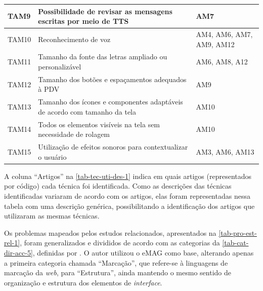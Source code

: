 \begin{table}[htb]
\begin{center}
\begin{tabular}{p{1.2cm}|p{9.2cm}|p{4.1cm}}
            \hline
            TAM9            & Possibilidade de revisar as mensagens escritas por meio de TTS                                     & AM7                                                                  \\
            \hline
            TAM10           & Reconhecimento de voz                                                                              & AM4, AM6, AM7, AM9, AM12                                             \\
            \hline
            TAM11           & Tamanho da fonte das letras ampliado ou personalizável                                             & AM6, AM8, A12                                                        \\
            \hline
            TAM12           & Tamanho dos botões e espaçamentos adequados à PDV                                                  & AM9                                                                  \\
            \hline
            TAM13           & Tamanho dos ícones e componentes adaptáveis de acordo com tamanho da tela                          & AM10                                                                 \\
            \hline
            TAM14           & Todos os elementos visíveis na tela sem necessidade de rolagem                                     & AM10                                                                 \\
            \hline
            TAM15           & Utilização de efeitos sonoros para contextualizar o usuário                                        & AM3, AM6, AM13                                                       \\
        \end{tabular}
    \end{center}
\end{table}

A coluna ``Artigos'' na \autoref{tab-tec-uti-des-1} indica em quais artigos (representados por código) cada técnica foi identificada.
Como as descrições das técnicas identificadas variaram de acordo com os artigos, elas foram representadas nessa tabela
com uma descrição genérica, possibilitando a identificação dos artigos que utilizaram as mesmas técnicas.

\newpage

Os problemas mapeados pelos estudos relacionados, apresentados na \autoref{tab-pro-est-rel-1}, foram generalizados e divididos de acordo com as categorias
da \autoref{tab-cat-dir-acc-5}, definidas por . O autor utilizou o eMAG como base,
alterando apenas a primeira categoria chamada ``Marcação'', que refere-se à linguagens de marcação da \emph{web},
para ``Estrutura'', ainda mantendo o mesmo sentido de organização e estrutura dos elementos de \emph{interface}.

